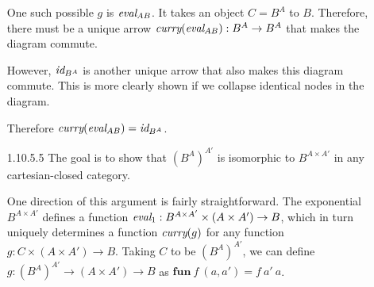 \documentclass{article}
\newcommand{\curry}[1]{\emph{curry}(#1)}
\newcommand{\eval}{\emph{eval}}
\newcommand{\id}{\emph{id}}
\begin{document}
\begin{enumerate}
\begin{center}
  \end{center}

  One such possible $g$ is $\eval_{AB}$.
  It takes an object $C = B^A$ to $B$.
  Therefore, there must be a unique arrow $\curry{\eval_{AB}} : B^A \rightarrow B^A$ that makes the diagram commute.
  \begin{center}
  \end{center}
  
  However, $\id_{B^A}$ is another unique arrow that also makes this diagram commute.
  This is more clearly shown if we collapse identical nodes in the diagram.
  \begin{center}
  \end{center}

  Therefore $\curry{\eval_{AB}} = \id_{B^A}$.

\newpage
\item [1.10.5.5]
  The goal is to show that $(B^A)^{A'}$ is isomorphic to $B^{A \times A'}$ in any cartesian-closed category.

  One direction of this argument is fairly straightforward.
  The exponential $B^{A \times A'}$ defines a function $\eval_1 : B^{A \times A'} \times (A \times A') \rightarrow B$, which in turn uniquely determines a function $\curry{g}$ for any function $g : C \times (A \times A') \rightarrow B$.
  Taking $C$ to be $(B^A)^{A'}$, we can define $g : (B^A)^{A'} \rightarrow (A \times A') \rightarrow B$ as $\mathbf{fun}~f~(a,a') = f~a'~a$.
  \begin{center}
\end{center}
\end{enumerate}
\end{document}
